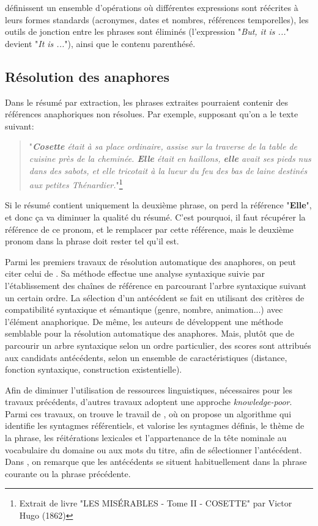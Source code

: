 \documentclass[a4paper,12pt,oneside]{../use/ESIthesis}
\begin{document}
\cite{08-boudin-al} définissent un ensemble d'opérations où différentes expressions sont réécrites à leurs formes standards (acronymes, dates et nombres, références temporelles), les outils de jonction entre les phrases sont éliminés (l'expression "\textit{But, it is ...}" devient "\textit{It is ...}"), ainsi que le contenu parenthésé. 

\subsection{Résolution des anaphores}

Dans le résumé par extraction, les phrases extraites pourraient contenir des références anaphoriques non résolues.
Par exemple, supposant qu'on a le texte suivant:
\begin{quote}
"\textit{\textbf{Cosette} était à sa place ordinaire, assise sur la traverse de la table de cuisine près de la cheminée. 
\textbf{Elle} était en haillons, \textbf{elle} avait ses pieds nus dans des sabots, et elle tricotait à la lueur du feu des bas de laine destinés aux petites Thénardier.}"\footnote{Extrait de livre "LES MISÉRABLES - Tome II - COSETTE" par Victor Hugo (1862)}
\end{quote}
Si le résumé contient uniquement la deuxième phrase, on perd la référence "\textbf{Elle}", et donc ça va diminuer la qualité du résumé. 
C'est pourquoi, il faut récupérer la référence de ce pronom, et le remplacer par cette référence, mais le deuxième pronom dans la phrase doit rester tel qu'il est.

Parmi les premiers travaux de résolution automatique des anaphores, on peut citer celui de \cite{78-hobbs}. 
Sa méthode effectue une analyse syntaxique suivie par l'établissement des chaînes de référence en parcourant l'arbre syntaxique suivant un certain ordre. 
La sélection d'un antécédent se fait en utilisant des critères de compatibilité syntaxique et sémantique (genre, nombre, animation...) avec l'élément anaphorique. 
De même, les auteurs de \cite{94-lappin-leass} développent une méthode semblable pour la résolution automatique des anaphores. 
Mais, plutôt que de parcourir un arbre syntaxique selon un ordre particulier, des scores sont attribués aux candidats antécédents, selon un ensemble de caractéristiques (distance, fonction syntaxique, construction existentielle).

Afin de diminuer l'utilisation de ressources linguistiques, nécessaires pour les travaux précédents, d'autres travaux adoptent une approche \textit{knowledge-poor}.
Parmi ces travaux, on trouve le travail de \cite{98-mitkov}, où on propose un algorithme qui identifie les syntagmes référentiels, et valorise les syntagmes définis, le thème de la phrase, les réitérations lexicales et l'appartenance de la tête nominale au vocabulaire du domaine ou aux mots du titre, afin de sélectionner l'antécédent. 
Dans \cite{97-baldwin}, on remarque que les antécédents se situent habituellement dans la phrase courante ou la phrase précédente.
\end{document}
